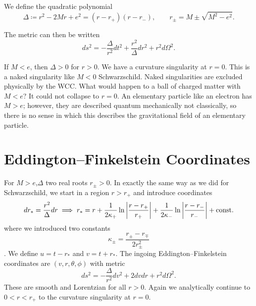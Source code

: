 
\begin{notation}[]
  We define the quadratic polynomial
  \begin{equation}
    \Delta \coloneqq r^2 - 2 M r + e^2 = (r - r_+) (r - r_-), \qquad r_{\pm} = M \pm \sqrt{M^2 - e^2}.
  \end{equation}
\end{notation}
The metric can then be written
\begin{equation}
  ds^2 = -\frac{\Delta}{r^2}  dt^2 + \frac{r^2}{\Delta} dr^2 + r^2 d\Omega^2.
\end{equation}

If $M < e$, then $\Delta > 0$ for $r > 0$. We have a curvature singularity at $r = 0$. This is a naked singularity like $M < 0$ Schwarzschild.
Naked singularities are excluded physically by the WCC.
What would happen to a ball of charged matter with $M < e$? It could not collapse to $r = 0$.
An elementary particle like an electron has $M > e$; however, they are described quantum mechanically not classically, so there is no sense in which this describes the gravitational field of an elementary particle.

\section{Eddington--Finkelstein Coordinates}%
\label{sec:eddington_finkelstein_coordinates_II}

For $M> e$,$\Delta$ two real roots $r_{\pm} > 0$.
In exactly the same way as we did for Schwarzschild, we start in a region $r > r_+$ and introduce coordinates
\begin{equation}
  dr_* = \frac{r^2}{\Delta} dr \implies r_* = r + \frac{1}{2 \kappa_+} \ln \abs{\frac{r - r_+}{r_+}} + \frac{1}{2 \kappa_-} \ln \abs{\frac{r - r_-}{r_-}} + \text{const.}
\end{equation}
where we introduced two constants 
\begin{equation}
  \label{eq:14-kappa}
  \kappa_{\pm} = \frac{r_{\pm} - r_{\mp}}{2 r_{\pm}^2}
\end{equation}.
We define $u = t - r_*$ and $v = t + r_*$. 
The ingoing Eddington--Finkelstein coordinates are $(v, r, \theta, \phi)$ with metric
\begin{equation}
  ds^2= - \frac{\Delta}{r^2} dv^2 + 2 d v d r + r^2 d\Omega^2.
\end{equation}
These are smooth and Lorentzian for all $r > 0$. Again we analytically continue to $0 < r < r_+$ to the curvature singularity at $r = 0$.


